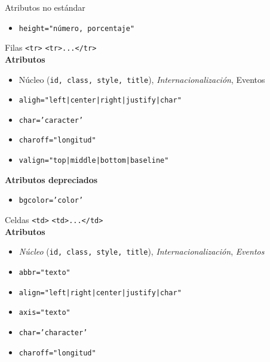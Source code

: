\documentclass{beamer}
\begin{document}
\begin{frame}{Atributos no estándar} %
    \begin{center}
        \begin{itemize}
            \item \texttt{height="número, porcentaje"}
        \end{itemize}
    \end{center}
\end{frame}

\begin{frame}{Filas \texttt{<tr>}} %
    \texttt{<tr>...</tr>}\\[0.5cm]
    \pause
    \textbf{Atributos}
    \begin{itemize}
        \item Núcleo (\texttt{id, class, style, title}),
        \textit{Internacionalización}, Eventos
        \item \texttt{aligh="left|center|right|justify|char"}
        \item \texttt{char='caracter'}
        \item \texttt{charoff="longitud"}
        \item \texttt{valign="top|middle|bottom|baseline"}
    \end{itemize}
    \pause 
    \textbf{Atributos depreciados}
    \begin{itemize}
        \item \texttt{bgcolor='color'}
    \end{itemize}
\end{frame}

\begin{frame}{Celdas \texttt{<td>}} %
        \texttt{<td>...</td>}\\
        \textbf{Atributos}
        {\footnotesize 
        \begin{itemize}
            \item \textit{Núcleo} (\texttt{id, class, style, title}), \textit{Internacionalización}, \textit{Eventos}
            \item \texttt{abbr="texto"}
            \item \texttt{align="left|right|center|justify|char"}
            \item \texttt{axis="texto"}
            \item \texttt{char='character'}
            \item \texttt{charoff="longitud"}
        \end{itemize}
        }
\end{frame}
\end{document}
